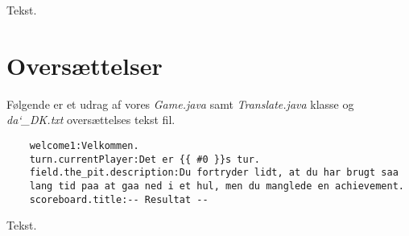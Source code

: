 \noindent Tekst.\\

\section{Oversættelser}
\noindent Følgende er et udrag af vores \textit{Game.java} samt \textit{Translate.java} klasse og \textit{da\char`_DK.txt} oversættelses tekst fil.\\
\begin{lstlisting}
    welcome1:Velkommen.
    turn.currentPlayer:Det er {{ #0 }}s tur.
    field.the_pit.description:Du fortryder lidt, at du har brugt saa
    lang tid paa at gaa ned i et hul, men du manglede en achievement.    
    scoreboard.title:-- Resultat --    
\end{lstlisting}
\vspace{2ex}

\noindent Tekst.\\
